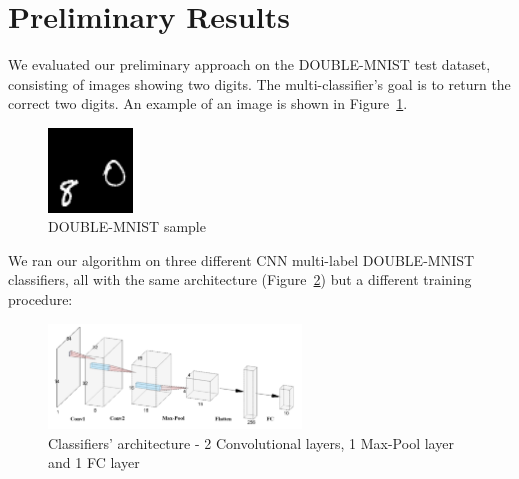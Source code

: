 
\section{Preliminary Results}
We evaluated our preliminary approach on the DOUBLE-MNIST test dataset, consisting of images showing two digits.
The multi-classifier's goal is to return the correct two digits. %
An example of an image is shown in Figure~\ref{fig:double-mnist-sample}. %
\begin{figure}
    \centering
    \includegraphics[width=0.2\textwidth]{108_80.png}
    \caption{DOUBLE-MNIST sample}
    \label{fig:double-mnist-sample}
\end{figure}
We ran our algorithm on three different CNN multi-label DOUBLE-MNIST classifiers, all with the same architecture (Figure~\ref{fig:arch_labeled}) but a different training procedure:
\begin{figure}
    \centering
    \includegraphics[width=0.6\textwidth]{arch_labeled.png}
    \caption{Classifiers' architecture - 2 Convolutional layers, 1 Max-Pool layer and 1 FC layer}
    \label{fig:arch_labeled}
\end{figure}
